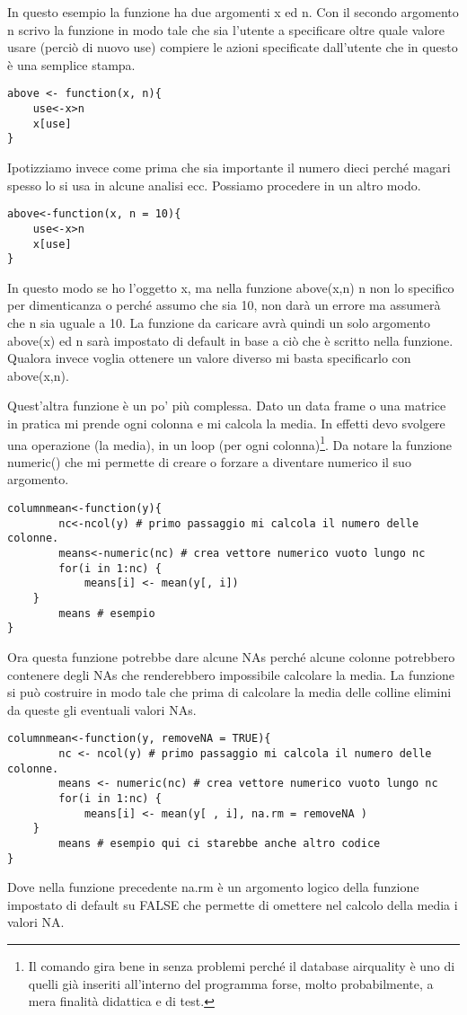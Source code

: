 In questo esempio la funzione ha due argomenti x ed n. Con il secondo argomento n
scrivo la funzione in modo tale che sia l'utente a specificare oltre quale valore
usare (perciò di nuovo use) compiere le azioni specificate dall'utente che in questo è una semplice stampa.
\begin{lstlisting}
above <- function(x, n){
	use<-x>n
	x[use]
}
\end{lstlisting}

Ipotizziamo invece come prima che sia importante il numero dieci perché magari
spesso lo si usa in alcune analisi ecc. Possiamo procedere in un altro modo.
\begin{lstlisting}
above<-function(x, n = 10){
	use<-x>n
	x[use]
}
\end{lstlisting}
In questo modo se ho l'oggetto x, ma nella funzione above(x,n) n non lo specifico
per dimenticanza o perché assumo che sia 10, \erre non darà un errore ma assumerà
che n sia uguale a 10. La funzione da caricare avrà quindi un solo argomento above(x)
ed n sarà impostato di default in base a ciò che è scritto nella funzione.
Qualora invece voglia ottenere un valore diverso mi basta specificarlo con above(x,n).


Quest'altra funzione è un po' più complessa. Dato un data frame o una matrice in pratica
mi prende ogni colonna e mi calcola la media. In effetti devo svolgere una operazione 
(la media), in un loop (per ogni colonna)\footnote{Il comando gira bene in \erre senza problemi perché il database airquality è uno di quelli già inseriti all'interno del programma forse, molto probabilmente, a mera finalità didattica e di test.}. Da notare la funzione numeric() che mi permette di creare o forzare a diventare numerico il suo argomento.

\begin{lstlisting}
columnmean<-function(y){
		nc<-ncol(y) # primo passaggio mi calcola il numero delle colonne.
		means<-numeric(nc) # crea vettore numerico vuoto lungo nc
		for(i in 1:nc) {
			means[i] <- mean(y[, i])
	}
		means # esempio
}
\end{lstlisting}

Ora questa funzione potrebbe dare alcune NAs perché alcune colonne potrebbero contenere
degli NAs che renderebbero impossibile calcolare la media.
La funzione si può costruire in modo tale che prima di calcolare la media delle colline
elimini da queste gli eventuali valori NAs.
\begin{lstlisting}
columnmean<-function(y, removeNA = TRUE){
		nc <- ncol(y) # primo passaggio mi calcola il numero delle colonne.
		means <- numeric(nc) # crea vettore numerico vuoto lungo nc
		for(i in 1:nc) {
			means[i] <- mean(y[ , i], na.rm = removeNA )
	}
		means # esempio qui ci starebbe anche altro codice 
}
\end{lstlisting}
Dove nella funzione precedente na.rm è un argomento logico della funzione impostato di
default su FALSE che permette di omettere nel calcolo della media i valori NA.

